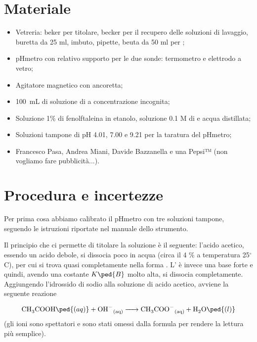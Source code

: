 \section*{Materiale}

\begin{itemize}
        \setlength{\parskip}{0pt}
        \item{Vetreria: beker per titolare, becker per il recupero delle soluzioni di lavaggio,
            buretta da 25 ml, imbuto, pipette, beuta da 50 ml per ;}
        \item{pHmetro con relativo supporto per le due sonde: termometro e elettrodo a vetro;}
        \item{Agitatore magnetico con ancoretta;}
        \item{\SI{100}{\milli\liter} di soluzione di  a concentrazione incognita;}
        \item{Soluzione 1\% di fenolftaleina in etanolo, soluzione 0.1 M di  e acqua distillata;}
        \item{Soluzioni tampone di pH 4.01, 7.00 e 9.21 per la taratura del pHmetro;}
        \item{Francesco Pasa, Andrea Miani, Davide Bazzanella e una Pepsi™ (non vogliamo fare pubblicità...).}
\end{itemize}

\section*{Procedura e incertezze}

Per prima cosa abbiamo calibrato il pHmetro con tre soluzioni tampone,
seguendo le istruzioni riportate nel manuale dello strumento.

Il principio che ci permette di titolare la soluzione è il seguente: l'acido acetico, essendo un acido debole,
si dissocia poco in acqua (circa il 4 \% a temperatura 25$^\circ$C),
per cui si trova quasi completamente nella forma .
L' è invece una base forte e quindi, avendo una costante $K\ped{B}$ molto alta,
si dissocia completamente. Aggiungendo l'idrossido di sodio alla soluzione di acido acetico,
avviene la seguente reazione

\begin{equation}
    \ce{CH3COOH\ped{(aq)} + OH- _{(aq)} -> CH3COO- _{(aq)} + H2O\ped{(l)}}
    \label{eq:reaz}
\end{equation}
%
(gli ioni  sono spettatori e sono stati omessi dalla formula per rendere la lettura più semplice).

